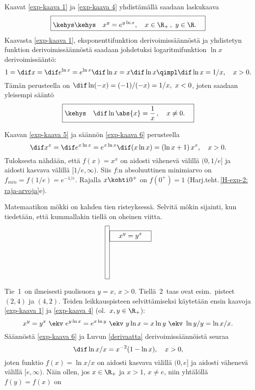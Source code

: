 Kaavat \eqref{exp-kaava 1} ja \eqref{exp-kaava 4} yhdistämällä saadaan laskukaava
\begin{equation} \label{exp-kaava 5}
\boxed{\kehys\rule{0mm}{4.5mm}\kehys\quad x^y=e^{y\ln x}, \quad x\in\R_+\,,\ y\in\R. \quad}
\end{equation}
Kaavasta \eqref{exp-kaava 1}, eksponenttifunktion derivoimissäännöstä ja yhdistetyn funktion 
derivoimissäännöstä saadaan johdetuksi logaritmifunktion $\ln x$ derivoimissääntö:
% 
\[ 
1=\dif x = \dif e^{\ln x} = e^{\ln x} \dif \ln x 
         = x \dif \ln x \qimpl \dif \ln x = 1/x, \quad x>0. 
\]
Tämän perusteella on $\dif \ln(-x) = (-1)/(-x) = 1/x,\ x<0$, joten saadaan yleisempi sääntö
\begin{equation} \label{exp-kaava 6}
\boxed{\kehys\quad \dif \ln \abs{x} = \dfrac{1}{x}\,, \quad x \neq 0. \quad} 
\end{equation}
\begin{Exa} Kaavan \eqref{exp-kaava 5} ja säännön \eqref{exp-kaava 6} perusteella
\[ 
\dif x^x = \dif e^{x\ln x} = e^{x\ln x}\dif(x\ln x) = (\ln x + 1)\,x^x, \quad x>0.
\]
Tuloksesta nähdään, että $f(x)=x^x$ on aidosti vähenevä välillä $(0,1/e]$ ja aidosti kasvava
välillä $[1/e,\infty)$. Siis $f$:n absoluuttinen minimiarvo on $f_{min}=f(1/e)=e^{-1/e}$.
Rajalla $x \kohti 0^+$ on $f(0^+)=1$ (Harj.teht.\,\ref{H-exp-2: raja-arvoja}e). \loppu
\end{Exa}
\begin{multicols}{2} \raggedcolumns
\begin{Exa} Matemaatikon mökki on kahden tien risteyksessä. Selvitä mökin sijainti, kun 
tiedetään, että kummallakin tiellä on oheinen viitta. 
\vspace{1cm}
\[ 
\boxed{ \rule[-2cm]{0mm}{2.5cm} } \boxed{ \quad x^y = y^x \quad } 
\]
\end{Exa}
\end{multicols}
\ratk Tie \,1\, on ilmeisesti puolisuora $y=x$, $x>0$. Tiellä \,2\, taas ovat esim.\ pisteet 
$(2,4)$ ja $(4,2)$. Teiden leikkauspisteen selvittämiseksi käytetään ensin kaavoja 
\eqref{exp-kaava 1} ja \eqref{exp-kaava 4} (ol.\ $x,y\in\R_+$):
\[
x^y=y^x\ \ekv\ e^{y\ln x} = e^{x\ln y}\ \ekv\ y\ln x = x\ln y\ 
                                        \ekv\ \ln y/y = \ln x/x.
\]
Säännöstä \eqref{exp-kaava 6} ja Luvun \ref{derivaatta} derivoimissäännöistä seuraa
\[ 
\dif \ln x/x = x^{-2}(1 - \ln x), \quad x>0, 
\]
joten funktio $f(x)=\ln x/x$ on aidosti kasvava välillä $(0,e]$ ja aidosti vähenevä välillä 
$[e,\infty)$. Näin ollen, jos $x\in\R_+$ ja $x>1$, $x\neq e$, niin yhtälöllä $f(y)=f(x)$ on 
